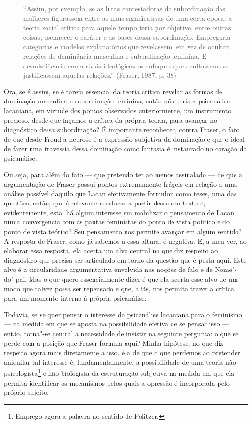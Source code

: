 \begin{quote}
``Assim, por exemplo, se as lutas contestadoras da subordinação das
mulheres figurassem entre as mais significativas de uma certa época, a
teoria social crítica para aquele tempo teria por objetivo, entre outras
coisas, esclarecer o caráter e as bases dessa subordinação. Empregaria
categorias e modelos explanatórios que revelassem, em vez de ocultar,
relações de dominância masculina e subordinação feminina. E
desmistificaria como rivais ideológicos os enfoques que ocultassem ou
justificassem aquelas relações.'' (Fraser, 1987, p. 38)
\end{quote}

Ora, se é assim, se é tarefa essencial da teoria crítica revelar as
formas de dominação masculina e subordinação feminina, então não seria a
psicanálise lacaniana, em virtude dos pontos observados anteriormente,
um instrumento precioso, desde que façamos a crítica da própria teoria,
para avançar no diagnóstico dessa subordinação? É importante reconhecer,
contra Fraser, o fato de que desde Freud a neurose é a expressão
subjetiva da dominação e que o ideal de fazer uma travessia dessa
dominação como fantasia é instaurado no coração da psicanálise.

Ou seja, para além do fato --- que pretendo ter ao menos assinalado --- de
que a argumentação de Fraser possui pontos extremamente frágeis em
relação a uma análise possível daquilo que Lacan efetivamente formulou
como teses, uma das questões, então, que é relevante recolocar a partir
desse seu texto é, evidentemente, esta: há algum interesse em mobilizar
o pensamento de Lacan numa convergência com as pautas feministas do
ponto de vista político e do ponto de vista teórico? Seu pensamento nos
permite avançar em algum sentido? A resposta de Fraser, como já sabemos
a essa altura, é negativa. E, a meu ver, ao elaborar essa resposta, ela
acerta um alvo central no que diz respeito ao diagnóstico que precisa
ser articulado em torno da questão que é posta aqui. Este alvo é a
circularidade argumentativa envolvida nas noções de falo e de
Nome"-do"-pai. Mas o que quero essencialmente dizer é que ela acerta esse
alvo de um modo que talvez possa ser repensado e que, aliás, nos permita
trazer a crítica para um momento interno à própria psicanálise.

Todavia, se se quer pensar o interesse da psicanálise lacaniana para o
feminismo --- na medida em que se aposta na possibilidade efetiva de se
pensar isso --- então, torna"-se central a necessidade de insistir na
seguinte pergunta: o que se perde com a posição que Fraser formula aqui?
Minha hipótese, no que diz respeito agora mais diretamente a isso, é a
de que o que perdemos ao pretender aniquilar tal interesse é,
fundamentalmente, a possibilidade de uma teoria não
psicologista\footnote{Emprego agora a palavra no sentido de Politzer.} e
não biologista da estruturação subjetiva na medida em que ela permita
identificar os mecanismos pelos quais a opressão é incorporada pelo
próprio sujeito.

